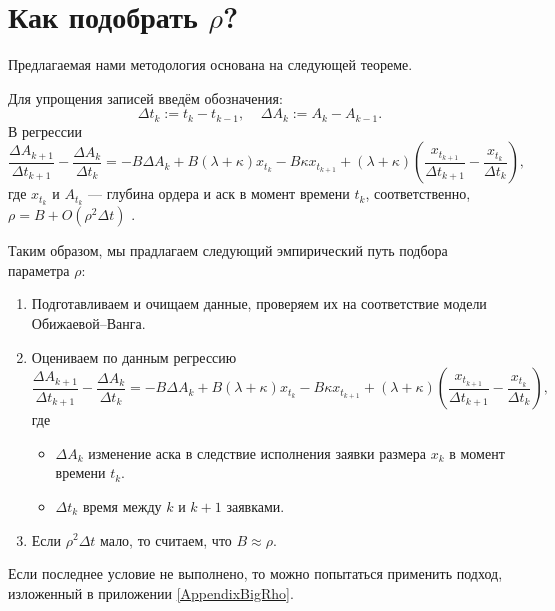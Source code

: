 \section{Как подобрать $\rho$?}
Предлагаемая нами методология основана на следующей теореме.
\begin{theorem}\label{lilreg}
    Для упрощения записей введём обозначения:
    \[
    \Delta t_{k} := t_{k} - t_{k-1}, \; \; \; \;   
    \Delta A_{k} := A_{k} - A_{k-1}. 
    \]
    В регрессии                                                                                                                                                                                                                                                                                                                                                                                       
    \begin{equation*}
            \frac{\Delta A_{k+1}}{\Delta t_{k+1}} - \frac{\Delta A_{k}}{\Delta t_{k}}
            = -B \Delta A_k + B (\lambda + \kappa) x_{t_k} - B \kappa x_{t_{k+1}} + 
            (\lambda + \kappa) \left(\frac{x_{t_{k+1}}}{\Delta t_{k+1}} - \frac{x_{t_k}}{\Delta t_{k}}\right),
    \end{equation*}
    где $x_{t_k}$ и $A_{t_k}$ --- глубина ордера и аск в момент времени $t_k$, соответственно, \\
    $\rho = B + O(\rho^2 \Delta t)$ .
\end{theorem}
Таким образом, мы прадлагаем следующий эмпирический путь подбора параметра $\rho$:
\begin{enumerate}
    \item Подготавливаем и очищаем данные, проверяем их на соответствие модели Обижаевой--Ванга.
    \item Оцениваем по данным регрессию
    \begin{equation*}
        \frac{\Delta A_{k+1}}{\Delta t_{k+1}} - \frac{\Delta A_{k}}{\Delta t_{k}}
            = -B \Delta A_k + B (\lambda + \kappa) x_{t_k} - B \kappa x_{t_{k+1}} + 
            (\lambda + \kappa) \left(\frac{x_{t_{k+1}}}{\Delta t_{k+1}} - \frac{x_{t_k}}{\Delta t_{k}}\right),
    \end{equation*} 
    где
    \begin{itemize}
        \item $\Delta A_{k}$ изменение аска в следствие исполнения заявки размера $x_k$ в момент времени $t_k$.
        \item $\Delta t_{k}$ время между $k$ и $k + 1$ заявками.
    \end{itemize}
    \item Если $\rho^2 \Delta t$ мало, то считаем, что $B \approx \rho$.
\end{enumerate}
Если последнее условие не выполнено, то можно попытаться применить подход, изложенный в приложении \ref{AppendixBigRho}.


